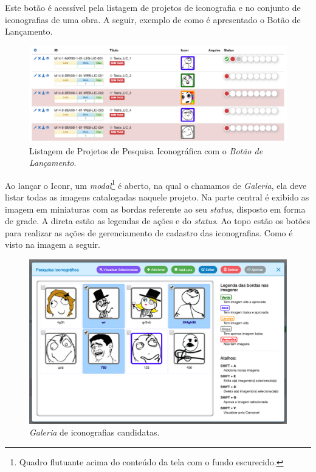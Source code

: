 \documentclass[
  12pt,            %
  openany,
  oneside,
  a4paper,         %
  english,      %
  brazil
]{article}
\numberwithin{figure}{section}
\numberwithin{table}{section}
\begin{document}
Este botão é acessível pela listagem de projetos de iconografia e no conjunto de iconografias de uma obra. A seguir, exemplo de como é apresentado o Botão de Lançamento.

\begin{figure}[H]
  \centering
  \includegraphics[width=\linewidth]{iconr_launch_index}
  \vspace{-10mm}
  \caption{Listagem de Projetos de Pesquisa Iconográfica com o \textit{Botão de Lançamento}.}
  \label{fig:iconr:index}
\end{figure}

Ao lançar o Iconr, um \textit{modal}\footnote{Quadro flutuante acima do conteúdo da tela com o fundo escurecido.} é aberto, na qual o chamamos de \textit{Galeria}, ela deve listar todas as imagens catalogadas naquele projeto. Na parte central é exibido as imagem em miniaturas com as bordas referente ao seu \textit{status}, disposto em forma de grade. A direta estão as legendas de ações e do \textit{status}. Ao topo estão os botões para realizar as ações de gerenciamento de cadastro das iconografias. Como é visto na imagem a seguir.

\begin{figure}[H]
  \centering
  \includegraphics[width=0.9\linewidth]{iconr_gallery}
  \caption{\textit{Galeria} de iconografias candidatas.}
  \label{fig:iconr:gallery}
\end{figure}
\end{document}
